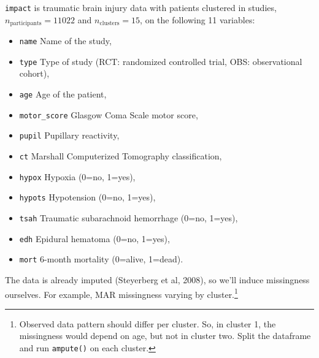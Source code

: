 \documentclass[
]{jss}
\providecommand{\tightlist}{%
  \setlength{\itemsep}{0pt}\setlength{\parskip}{0pt}}
\begin{document}
\texttt{impact} is traumatic brain injury data with patients clustered
in studies, \(n_{\text{participants}} = 11022\) and
\(n_{\text{clusters}} = 15\), on the following 11 variables:

\begin{itemize}
\tightlist
\item
  \texttt{name} Name of the study,
\item
  \texttt{type} Type of study (RCT: randomized controlled trial, OBS:
  observational cohort),
\item
  \texttt{age} Age of the patient,
\item
  \texttt{motor\_score} Glasgow Coma Scale motor score,
\item
  \texttt{pupil} Pupillary reactivity,
\item
  \texttt{ct} Marshall Computerized Tomography classification,
\item
  \texttt{hypox} Hypoxia (0=no, 1=yes),
\item
  \texttt{hypots} Hypotension (0=no, 1=yes),
\item
  \texttt{tsah} Traumatic subarachnoid hemorrhage (0=no, 1=yes),
\item
  \texttt{edh} Epidural hematoma (0=no, 1=yes),
\item
  \texttt{mort} 6-month mortality (0=alive, 1=dead).
\end{itemize}

The data is already imputed (Steyerberg et al, 2008), so we'll induce
missingness ourselves. For example, MAR missingness varying by
cluster.\footnote{Observed data pattern should differ per cluster. So,
  in cluster 1, the missingness would depend on age, but not in cluster
  two. Split the dataframe and run \texttt{ampute()} on each cluster.}
\end{document}
